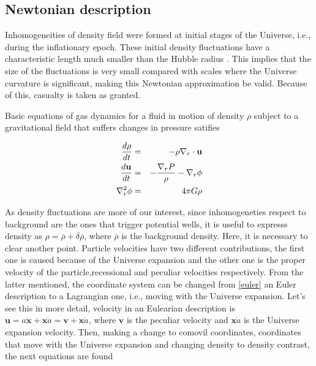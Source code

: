 \subsection{ Newtonian description  }


Inhomogeneities of density field were formed at initial stages of the Universe, i.e.,
during the inflationary epoch. These initial density fluctuations 
have a characteristic length much smaller than the Hubble radius . This implies that the
size of the fluctuations is very small compared with scales where the Universe curvature 
is significant, making this Newtonian approximation be valid. Because of this, casualty 
is taken as granted.

Basic equations of gas dynamics for a fluid in motion of density $\rho$ 
subject to a gravitational field that suffers changes in pressure satifies 

\begin{eqnarray}
\frac{d \rho}{d t}&=& -\rho \nabla_r\cdot \textbf{u} \nonumber\\
\frac{d \textbf{u}}{d t} &=& -\frac{\nabla_r P}{\rho}-\nabla_r\phi \nonumber\\
\nabla^2_r \phi & =& 4\pi G\rho 
\label{euler}
\end{eqnarray}

As density fluctuations are more of our interest, since inhomogeneties 
respect to background are the ones that trigger potential wells, it is
useful to expresss density as $\rho = \overline{\rho}+\delta\overline{\rho}$, where
$\overline{\rho}$ is the background density. 
Here, it is necessary to clear another point. Particle velocities have 
two different contributions, the first one is caused because of the Universe
expansion and the other one is the proper velocity of the particle,recessional 
and peculiar velocities respectively. 
From the latter mentioned, the coordinate system can be changed from \ref{euler}
an Euler description to a Lagrangian one, i.e., moving with the Universe expansion.
Let's see this in more detail, velocity in an Eulearian description is 
$\textbf{u}= a\dot{\textbf{x}}+ \textbf{x}\dot{a} = \textbf{v}+\textbf{x}\dot{a}$, 
where $\textbf{v}$ is the peculiar velocity and $\textbf{x}\dot{a}$ is the Universe 
expansion velocity. 
Then, making a change to comovil coordinates, coordinates that move with the Universe
expansion and changing density to density contrast, the next equations are found

